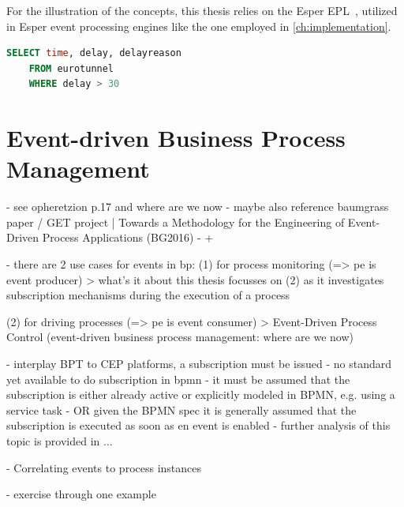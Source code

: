 For the illustration of the concepts, this thesis relies on the Esper \ac{EPL}~\cite{esperhome}, utilized in Esper event processing engines like the one employed in \autoref{ch:implementation}.


\begin{lstlisting}[language=sql,caption={A sample EPL Query},label=lst:epl-query-example]
	SELECT time, delay, delayreason
	FROM eurotunnel
	WHERE delay > 30
\end{lstlisting}

\section{Event-driven Business Process Management}
- see opheretzion p.17 and where are we now
- maybe also reference baumgrass paper / GET project | Towards a Methodology for the Engineering
of Event-Driven Process Applications (BG2016)
- + 

- there are 2 use cases for events in bp: 
(1) for process monitoring (=> pe is event producer)
> what's it about
this thesis focusses on (2) as it investigates subscription mechanisms during the execution of a process

(2) for driving processes (=> pe is event consumer)
> Event-Driven Process Control (event-driven business process management: where are we now)

- interplay BPT to CEP platforms, a subscription must be issued
- no standard yet available to do subscription in bpmn
- it must be assumed that the subscription is either already active or explicitly modeled in BPMN, e.g. using a service task
- OR given the BPMN spec it is generally assumed that the subscription is executed as soon as en event is enabled
- further analysis of this topic is provided in ...

- Correlating events to process instances

- exercise through one example



